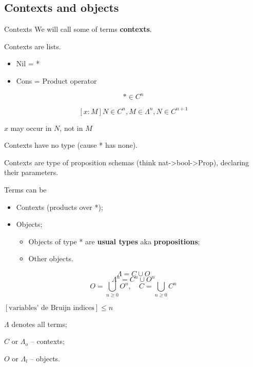 \documentclass{beamer}
\begin{document}
\subsection{Contexts and objects}

\begin{frame}{Contexts}
We will call some of terms \textbf{contexts}.

Contexts are lists.

\begin{itemize}
\item Nil = *
\item Cons = Product operator
\end{itemize} 

$$ * \in C^n$$

$$ [x:M] N \in C^n, M \in \Lambda^n,  N \in C^{n+1}$$

$x$ may occur in $N$, not in $M$

Contexts have no type (cause * has none).

Contexts are type of proposition schemas (think nat->bool->Prop), declaring their parameters.

\end{frame}

\begin{frame}{Terms can be}
\begin{itemize}
\item Contexts (products over *);
\item Objects;
\pause
\begin{itemize}
\item Objects of type * are \textbf	{usual types} aka \textbf{propositions};
\item Other objects.
\end{itemize}
\end{itemize}

\pause

$$\Lambda = C \cup O$$
$$\Lambda^n = C^n \cup O^n$$
$$O = \bigcup_{n\geq 0}  O^n, \quad C = \bigcup_{n\geq 0}  C^n$$

$[\text{variables' de Bruijn indices}] \leq n$

$\Lambda$ denotes all terms;

$C$ or $\Lambda_o$ -- contexts;

$O$ or $\Lambda_l$ -- objects.

\end{frame}
\end{document}
